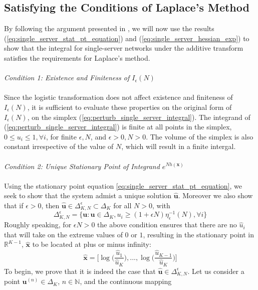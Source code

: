 \subsection{Satisfying the Conditions of Laplace's Method} \label{ssec:laplaces_method_conditions}

By following the argument presented in \cite{Casale2017AcceleratingMethods}, we will now use the results (\ref{eq:single_server_stat_pt_equation}) and (\ref{eq:single_server_hessian_exp}) to show that the integral for single-server networks under the additive transform satisfies the requirements for Laplace's method.
\\\\
\textit{\large{Condition 1: Existence and Finiteness of \(I_{\epsilon}(N)\)}}
\\\\
Since the logistic transformation does not affect existence and finiteness of \(I_{\epsilon}(N)\), it is sufficient to evaluate these properties on the original form of \(I_{\epsilon}(N)\), on the simplex (\ref{eq:perturb_single_server_integral}). The integrand of (\ref{eq:perturb_single_server_integral}) is finite at all points in the simplex, \(0 \leq u_i \leq  1 , \forall i\), for finite \(\epsilon, N\), and \(\epsilon > 0, N > 0\). The volume of the simplex is also constant irrespective of the value of \(N\), which will result in a finite intergal.
\\\\
\textit{\large{Condition 2: Unique Stationary Point of Integrand \(e^{N h(\mathbf{x})}\)}}
\\\\
Using the stationary point equation \ref{eq:single_server_stat_pt_equation}, we seek to show that the system admist a unique solution \(\mathbf{\hat{u}}\). Moreover we also show that if \(\epsilon > 0\), then \(\mathbf{\hat{u}} \in \Delta_{K,N}^{\epsilon} \subset \Delta_K\) for all \(N>0\), with
\[ \Delta_{K,N}^{\epsilon} = \{ \mathbf{u} : \mathbf{u} \in \Delta_K, u_i \geq (1+\epsilon N )\eta_{\epsilon}^{-1}(N), \forall i  \} \]
Roughly speaking, for \(\epsilon N > 0\) the above condition ensures that there are no \(\hat{u}_i\) that will take on the extreme values of \(0\) or \(1\), resulting in the stationary point in \(\mathbb{R}^{K-1}\), \(\mathbf{\hat{x}}\) to be located at plus or minus infinity:
\[ \mathbf{\hat{x}} = \bigg[ \log \bigg(\frac{\hat{u}_1}{\hat{u}_K} \bigg), ... , \log \bigg(\frac{\hat{u}_{K-1}}{\hat{u}_K}\bigg)  \bigg]\]
To begin, we prove that it is indeed the case that \(\mathbf{\hat{u}} \in \Delta_{K,N}^{\epsilon}\). Let us consider a point \(\mathbf{u}^{(n)} \in \Delta_K\), \(n \in \mathbb{N}\), and the continuous mapping
